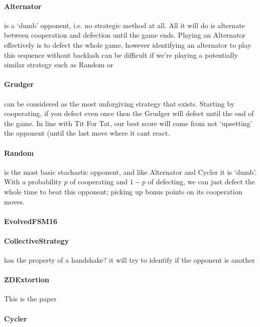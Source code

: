 \paragraph{Alternator} is a `dumb' opponent, i.e. no strategic method at all. All it will do is alternate between cooperation and defection until the game ends. Playing an Alternator effectively is to defect the whole game, however identifying an alternator to play this sequence without backlash can be difficult if we're playing a potentially similar strategy such as Random or 
\paragraph{Grudger} can be considered as the most unforgiving strategy that exists.
Starting by cooperating, if you defect even once then the Grudger will defect until the end of the game.
In line with Tit For Tat, our best score will come from not `upsetting' the opponent (until the last move where it cant react.
\paragraph{Random} is the most basic stochastic opponent, and like Alternator and Cycler it is `dumb'. 
With a probability $p$ of cooperating and $1-p$ of defecting, we can just defect the whole time to beat this opponent; picking up bonus points on its cooperation moves.
\paragraph{EvolvedFSM16}  
\paragraph{CollectiveStrategy} has the property of a handshake? it will try to identify if the opponent is another
\paragraph{ZDExtortion}
This is the paper~\cite{press2012iterated}
\paragraph{Cycler} 

